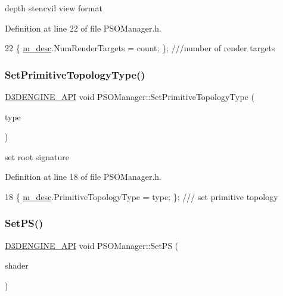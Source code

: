 depth stencvil view format 



Definition at line 22 of file P\+S\+O\+Manager.\+h.


\begin{DoxyCode}
22 \{ \mbox{\hyperlink{class_p_s_o_manager_ac5a7e346b2d641709d7146f5a0f45dee}{m\_desc}}.NumRenderTargets = count; \}; \textcolor{comment}{///number of render targets}
\end{DoxyCode}
\mbox{\label{class_p_s_o_manager_a3132d5f40a8a9ddde43be8e30b35d7a6}} 
\subsubsection{\texorpdfstring{Set\+Primitive\+Topology\+Type()}{SetPrimitiveTopologyType()}}
{\footnotesize\ttfamily \mbox{\hyperlink{stdafx_8h_a8ee2d990c5dfba7794dd2b60741d7722}{D3\+D\+E\+N\+G\+I\+N\+E\+\_\+\+A\+PI}} void P\+S\+O\+Manager\+::\+Set\+Primitive\+Topology\+Type (\begin{DoxyParamCaption}\item[{const D3\+D12\+\_\+\+P\+R\+I\+M\+I\+T\+I\+V\+E\+\_\+\+T\+O\+P\+O\+L\+O\+G\+Y\+\_\+\+T\+Y\+PE}]{type }\end{DoxyParamCaption})\hspace{0.3cm}{\ttfamily [inline]}}



set root signature 



Definition at line 18 of file P\+S\+O\+Manager.\+h.


\begin{DoxyCode}
18 \{ \mbox{\hyperlink{class_p_s_o_manager_ac5a7e346b2d641709d7146f5a0f45dee}{m\_desc}}.PrimitiveTopologyType = type; \}; \textcolor{comment}{/// set primitive topology}
\end{DoxyCode}
\mbox{\label{class_p_s_o_manager_a959ea6b1f4a67e00c77ed6281154f80a}} 
\subsubsection{\texorpdfstring{Set\+P\+S()}{SetPS()}}
{\footnotesize\ttfamily \mbox{\hyperlink{stdafx_8h_a8ee2d990c5dfba7794dd2b60741d7722}{D3\+D\+E\+N\+G\+I\+N\+E\+\_\+\+A\+PI}} void P\+S\+O\+Manager\+::\+Set\+PS (\begin{DoxyParamCaption}\item[{const C\+D3\+D\+X12\+\_\+\+S\+H\+A\+D\+E\+R\+\_\+\+B\+Y\+T\+E\+C\+O\+DE}]{shader }\end{DoxyParamCaption})\hspace{0.3cm}{\ttfamily [inline]}}




